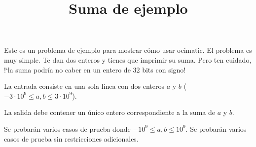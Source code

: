 \documentclass{oci}
\title{Suma de ejemplo}
\begin{document}
\begin{problemDescription}
  Este es un problema de ejemplo para mostrar cómo usar ocimatic.
  El problema es muy simple.
  Te dan dos enteros y tienes que imprimir su suma.
  Pero ten cuidado, !`la suma podría no caber en un entero de 32 bits con signo!
\end{problemDescription}

\begin{inputDescription}
  La entrada consiste en una sola línea con dos enteros $a$ y $b$ ($-3\cdot10^9 \leq a, b \leq 3\cdot10^9$).
\end{inputDescription}

\begin{outputDescription}
  La salida debe contener un único entero correspondiente a la suma de $a$ y $b$.
\end{outputDescription}

\begin{scoreDescription}
   Se probarán varios casos de prueba donde $-10^9\leq a, b \leq 10^9$.
   Se probarán varios casos de prueba sin restricciones adicionales.
\end{scoreDescription}

\begin{sampleDescription}
\end{sampleDescription}
\end{document}
